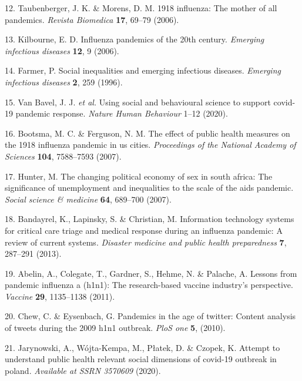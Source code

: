 \documentclass[
]{article}
\newenvironment{cslreferences}%
  {}%
  {\par}
\begin{document}
\begin{cslreferences}
\leavevmode\hypertarget{ref-taubenberger20061918}{}%
12. Taubenberger, J. K. \& Morens, D. M. 1918 influenza: The mother of all pandemics. \emph{Revista Biomedica} \textbf{17}, 69--79 (2006).

\leavevmode\hypertarget{ref-kilbourne2006influenza}{}%
13. Kilbourne, E. D. Influenza pandemics of the 20th century. \emph{Emerging infectious diseases} \textbf{12}, 9 (2006).

\leavevmode\hypertarget{ref-farmer1996social}{}%
14. Farmer, P. Social inequalities and emerging infectious diseases. \emph{Emerging infectious diseases} \textbf{2}, 259 (1996).

\leavevmode\hypertarget{ref-van2020using}{}%
15. Van Bavel, J. J. \emph{et al.} Using social and behavioural science to support covid-19 pandemic response. \emph{Nature Human Behaviour} 1--12 (2020).

\leavevmode\hypertarget{ref-bootsma2007effect}{}%
16. Bootsma, M. C. \& Ferguson, N. M. The effect of public health measures on the 1918 influenza pandemic in us cities. \emph{Proceedings of the National Academy of Sciences} \textbf{104}, 7588--7593 (2007).

\leavevmode\hypertarget{ref-hunter2007changing}{}%
17. Hunter, M. The changing political economy of sex in south africa: The significance of unemployment and inequalities to the scale of the aids pandemic. \emph{Social science \& medicine} \textbf{64}, 689--700 (2007).

\leavevmode\hypertarget{ref-bandayrel2013information}{}%
18. Bandayrel, K., Lapinsky, S. \& Christian, M. Information technology systems for critical care triage and medical response during an influenza pandemic: A review of current systems. \emph{Disaster medicine and public health preparedness} \textbf{7}, 287--291 (2013).

\leavevmode\hypertarget{ref-abelin2011lessons}{}%
19. Abelin, A., Colegate, T., Gardner, S., Hehme, N. \& Palache, A. Lessons from pandemic influenza a (h1n1): The research-based vaccine industry's perspective. \emph{Vaccine} \textbf{29}, 1135--1138 (2011).

\leavevmode\hypertarget{ref-chew2010pandemics}{}%
20. Chew, C. \& Eysenbach, G. Pandemics in the age of twitter: Content analysis of tweets during the 2009 h1n1 outbreak. \emph{PloS one} \textbf{5}, (2010).

\leavevmode\hypertarget{ref-jarynowski2020attempt}{}%
21. Jarynowski, A., Wójta-Kempa, M., Płatek, D. \& Czopek, K. Attempt to understand public health relevant social dimensions of covid-19 outbreak in poland. \emph{Available at SSRN 3570609} (2020).


\end{cslreferences}
\end{document}
